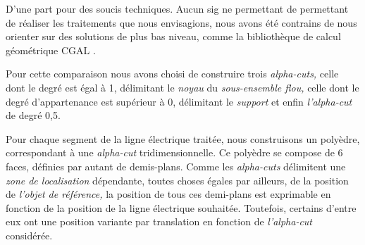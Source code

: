 D'une part pour des soucis techniques. Aucun \ac{sig} ne permettant de
permettant de réaliser les traitements que nous envisagions, nous
avons été contrains de nous orienter sur des solutions de plus bas
niveau, comme la bibliothèque de calcul géométrique CGAL
\autocite{CGAL2019}.





Pour cette comparaison nous avons choisi de construire trois \emph{alpha-cuts,} celle dont le degré est égal à 1, délimitant le \emph{noyau} du \emph{sous-ensemble flou,} celle dont le degré d'appartenance est supérieur à 0, délimitant le \emph{support} et enfin \emph{l'alpha-cut} de degré 0,5.

Pour chaque segment de la ligne électrique traitée, nous construisons un polyèdre, correspondant à une \emph{alpha-cut} tridimensionnelle. Ce polyèdre se compose de 6 faces, définies par autant de demis-plans. Comme les \emph{alpha-cuts} délimitent une \emph{zone de localisation} dépendante, toutes choses égales par ailleurs, de la position de \emph{l'objet de référence,} la position de tous ces demi-plans est exprimable en fonction de la position de la ligne électrique souhaitée. Toutefois, certains d'entre eux ont une position variante par translation en fonction de \emph{l'alpha-cut} considérée.

